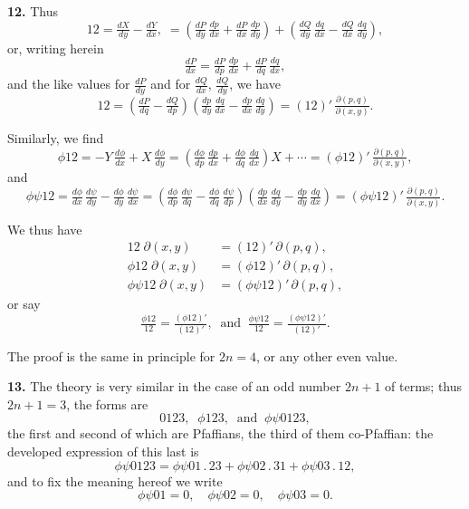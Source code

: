 \documentclass[11pt]{article}
\begin{document}
\medskip
\textbf{12.} Thus
\[ 12 = \tfrac{dX}{dy} - \tfrac{dY}{dx},\;=\!\left(\tfrac{dP}{dy}\,\tfrac{dp}{dx} + \tfrac{dP}{dx}\,\tfrac{dp}{dy}\right) + \left(\tfrac{dQ}{dy}\,\tfrac{dq}{dx} - \tfrac{dQ}{dx}\,\tfrac{dq}{dy}\right), \]
or, writing herein
\[ \tfrac{dP}{dx} = \tfrac{dP}{dp}\,\tfrac{dp}{dx} + \tfrac{dP}{dq}\,\tfrac{dq}{dx}, \]
and the like values for $\tfrac{dP}{dy}$ and for $\tfrac{dQ}{dx}$, $\tfrac{dQ}{dy}$, we have
\[ 12 = \!\left(\tfrac{dP}{dq} - \tfrac{dQ}{dp}\right)\!\left(\tfrac{dp}{dy}\,\tfrac{dq}{dx} - \tfrac{dp}{dx}\,\tfrac{dq}{dy}\right) = (12)'\,\tfrac{\partial(p,q)}{\partial(x,y)}. \]

Similarly, we find
\[ \phi 12 = -Y\,\tfrac{d\phi}{dx} + X\,\tfrac{d\phi}{dy} = \left(\tfrac{d\phi}{dp}\,\tfrac{dp}{dx} + \tfrac{d\phi}{dq}\,\tfrac{dq}{dx}\right) X + \cdots = (\phi 12)'\,\tfrac{\partial(p,q)}{\partial(x,y)}, \]
and
\[ \phi\psi 12 = \tfrac{d\phi}{dx}\,\tfrac{d\psi}{dy} - \tfrac{d\phi}{dy}\,\tfrac{d\psi}{dx} = \!\left(\tfrac{d\phi}{dp}\,\tfrac{d\psi}{dq} - \tfrac{d\phi}{dq}\,\tfrac{d\psi}{dp}\right)\!\left(\tfrac{dp}{dx}\,\tfrac{dq}{dy} - \tfrac{dp}{dy}\,\tfrac{dq}{dx}\right) = (\phi\psi 12)'\,\tfrac{\partial(p,q)}{\partial(x,y)}. \]

We thus have
\begin{align*}
12\;\partial(x,y) &= (12)'\,\partial(p,q),\\
\phi 12\;\partial(x,y) &= (\phi 12)'\,\partial(p,q),\\
\phi\psi 12\;\partial(x,y) &= (\phi\psi 12)'\,\partial(p,q),
\end{align*}
or say
\[ \tfrac{\phi 12}{12} = \tfrac{(\phi 12)'}{(12)'},\;\;\text{and}\;\;\tfrac{\phi\psi 12}{12} = \tfrac{(\phi\psi 12)'}{(12)'}. \]

The proof is the same in principle for $2n=4$, or any other even value.

\medskip
\textbf{13.} The theory is very similar in the case of an odd number $2n+1$ of terms; thus $2n+1=3$, the forms are
\[ 0123,\;\;\phi 123,\;\;\text{and}\;\;\phi\psi 0123, \]
the first and second of which are Pfaffians, the third of them co-Pfaffian: the developed expression of this last is
\[ \phi\psi 0123 = \phi\psi 01\,.\,23 + \phi\psi 02\,.\,31 + \phi\psi 03\,.\,12, \]
and to fix the meaning hereof we write
\[ \phi\psi 01 = 0,\quad \phi\psi 02 = 0,\quad \phi\psi 03 = 0. \]
\end{document}
